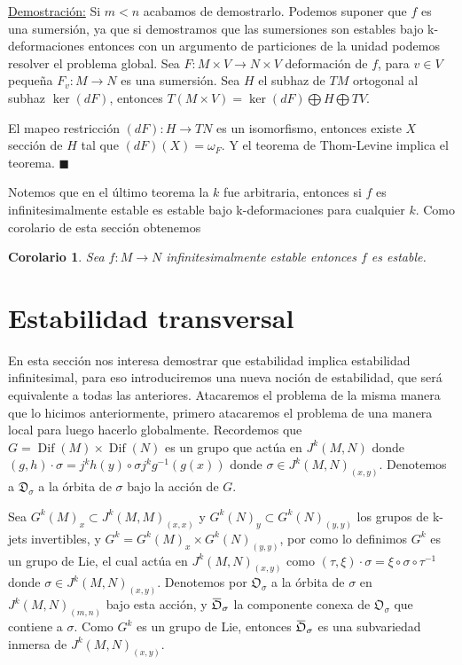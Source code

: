 \documentclass{report}
\newtheorem{coro}[theorem]{Corolario}
\theoremstyle{definition}
\DeclareMathOperator{\dif}{Dif}
\newcommand{\overbar}[1]{\mkern 1.5mu\overline{\mkern-1.5mu#1\mkern-1.5mu}\mkern 1.5mu}
\begin{document}
\underline{Demostraci\'on:} Si $m < n$ acabamos de demostrarlo. Podemos suponer que $f$ es una sumersi\'on, ya que si demostramos que las sumersiones son estables bajo k-deformaciones entonces con un argumento de particiones de la unidad podemos resolver el problema global. Sea $F: M \times V \to N \times V$ deformaci\'on de $f$, para $v \in V$ pequeña $F_v :M \to N$ es una sumersi\'on. Sea $H$ el subhaz de $TM$ ortogonal al subhaz $\ker(dF)$, entonces $T(M \times V) = \ker(dF) \bigoplus H \bigoplus TV$.

El mapeo restricci\'on $(dF): H \to TN$ es un isomorfismo, entonces existe $X$ secci\'on de $H$ tal que $(dF)(X) = \omega_F$. Y el teorema de Thom-Levine implica el teorema. $\blacksquare$

Notemos que en el \'ultimo teorema la $k$ fue arbitraria, entonces si $f$ es infinitesimalmente estable es estable bajo k-deformaciones para cualquier $k$. Como corolario de esta secci\'on obtenemos

\begin{coro}
Sea $f:M \to N$ infinitesimalmente estable entonces $f$ es estable.
\end{coro}

\section{Estabilidad transversal}

En esta secci\'on nos interesa demostrar que estabilidad implica estabilidad infinitesimal, para eso introduciremos una nueva noci\'on de estabilidad, que ser\'a equivalente a todas las anteriores. Atacaremos el problema de la misma manera que lo hicimos anteriormente, primero atacaremos el problema de una manera local para luego hacerlo globalmente. Recordemos que $G= \dif (M) \times \dif (N)$ es un grupo que act\'ua en $J^k (M,N)$ donde $(g,h) \cdot \sigma = j^k h(y) \circ \sigma j^k g^{-1} (g(x)) $ donde $\sigma \in J^k (M,N)_{(x,y)}$. Denotemos a $\mathfrak{D}_\sigma$ a la \'orbita de $\sigma$ bajo la acci\'on de $G$. 

Sea $G^k (M)_x \subset J^k(M,M)_{(x,x)}$ y $G^k (N)_y \subset G^k (N)_{(y,y)}$ los grupos de k-jets invertibles, y $G^k = G^k (M)_x \times G^k (N)_{(y,y)}$, por como lo definimos $G^k$ es un grupo de Lie, el cual act\'ua en $J^k (M,N)_{(x,y)}$ como $(\tau, \xi ) \cdot \sigma = \xi \circ \sigma \circ \tau^{-1}$ donde $\sigma \in J^k(M,N)_{(x,y)}$. Denotemos por $\mathfrak{O}_\sigma$ a la \'orbita de $\sigma$ en $J^k(M,N)_{(m,n)}$ bajo esta acci\'on, y $\overbar{\mathfrak{O}}_\sigma$ la componente conexa de $\mathfrak{O}_\sigma$ que contiene a $\sigma$. Como $G^k$ es un grupo de Lie, entonces $\overbar{\mathfrak{O}}_\sigma$ es una subvariedad inmersa de $J^k(M,N)_{(x,y)}$.
\end{document}
